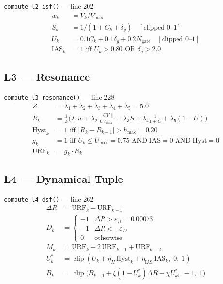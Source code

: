 \documentclass[11pt,a4paper]{article}
\newcommand{\code}[1]{\texttt{\small#1}}
\begin{document}
\code{compute\_l2\_isf()} — line 202
\begin{align}
  w_k   &= V_k / V_{\max}\\
  S_k   &= 1 / (1 + C_k + \delta_g) \quad [\text{clipped } 0\text{--}1]\\
  U_k   &= 0.1 C_k + 0.1 \delta_g + 0.2 N_{\text{gate}} \quad [\text{clipped } 0\text{--}1]\\
  \text{IAS}_k &= 1 \text{ iff } U_k > 0.80 \text{ OR } \delta_g > 2.0
\end{align}

\subsection{L3 — Resonance}

\code{compute\_l3\_resonance()} — line 228
\begin{align}
  Z     &= \lambda_1 + \lambda_2 + \lambda_3 + \lambda_4 + \lambda_5 = 5.0\\
  R_k   &= \tfrac{1}{Z}\bigl(\lambda_1 w + \lambda_2 \tfrac{\|CV\|}{CV_{\max}} + \lambda_3 S + \lambda_4 \tfrac{1}{1+C} + \lambda_5 (1-U)\bigr)\\
  \text{Hyst}_k &= 1 \text{ iff } |R_k - R_{k-1}| > h_{\max} = 0.20\\
  g_k   &= 1 \text{ iff } U_k \leq U_{\max} = 0.75 \text{ AND IAS}=0 \text{ AND Hyst}=0\\
  \text{URF}_k &= g_k \cdot R_k
\end{align}

\subsection{L4 — Dynamical Tuple}

\code{compute\_l4\_dsf()} — line 262
\begin{align}
  \Delta R &= \text{URF}_k - \text{URF}_{k-1}\\
  D_k &= \begin{cases}+1 & \Delta R > \varepsilon_D = 0.00073\\ -1 & \Delta R < -\varepsilon_D\\ 0 & \text{otherwise}\end{cases}\\
  M_k &= \text{URF}_k - 2\,\text{URF}_{k-1} + \text{URF}_{k-2}\\
  U^*_k &= \operatorname{clip}(U_k + \eta_H\,\text{Hyst}_k + \eta_{\text{IAS}}\,\text{IAS}_k,\;0,\;1)\\
  B_k &= \operatorname{clip}\!\bigl(B_{k-1} + \xi(1-U^*_k)\Delta R - \chi U^*_k,\;-1,\;1\bigr)
\end{align}
\end{document}
